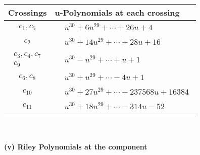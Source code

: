 \documentclass[1p]{elsarticle_modified}
\theoremstyle{definition}
\begin{document}
\begin{tabular}{m{50pt}|m{274pt}}
Crossings & \hspace{64pt}u-Polynomials at each crossing \\
\hline $$\begin{aligned}c_{1},c_{5}\end{aligned}$$&$\begin{aligned}
&u^{30}+6 u^{29}+\cdots+26 u+4
\end{aligned}$\\
\hline $$\begin{aligned}c_{2}\end{aligned}$$&$\begin{aligned}
&u^{30}+14 u^{29}+\cdots+28 u+16
\end{aligned}$\\
\hline $$\begin{aligned}c_{3},c_{4},c_{7}\\c_{9}\end{aligned}$$&$\begin{aligned}
&u^{30}- u^{29}+\cdots+u+1
\end{aligned}$\\
\hline $$\begin{aligned}c_{6},c_{8}\end{aligned}$$&$\begin{aligned}
&u^{30}+u^{29}+\cdots-4 u+1
\end{aligned}$\\
\hline $$\begin{aligned}c_{10}\end{aligned}$$&$\begin{aligned}
&u^{30}+27 u^{29}+\cdots+237568 u+16384
\end{aligned}$\\
\hline $$\begin{aligned}c_{11}\end{aligned}$$&$\begin{aligned}
&u^{30}+18 u^{29}+\cdots-314 u-52
\end{aligned}$\\
\hline
\end{tabular}\\~\\
\newpage\renewcommand{\arraystretch}{1}
\flushleft \textbf{(v) Riley Polynomials at the component}\newline \\
\end{document}
